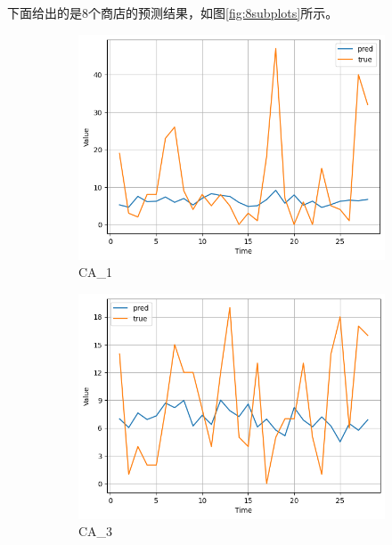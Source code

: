 \documentclass[12pt]{article}
\begin{document}
下面给出的是8个商店的预测结果，如图\ref{fig:8subplots}所示。

\begin{figure}[H]
    \centering
    \begin{subfigure}[b]{0.20\textwidth}
        \includegraphics[width=\textwidth]{image/output1.png}
        \caption{CA\_1}
        \label{fig:output1}
    \end{subfigure}
    \begin{subfigure}[b]{0.2\textwidth}
        \includegraphics[width=\textwidth]{image/output2.png}
        \caption{CA\_3}
        \label{fig:output2}
    \end{subfigure}
    \begin{subfigure}[b]{0.2\textwidth}

\end{subfigure}
\end{figure}
\end{document}
